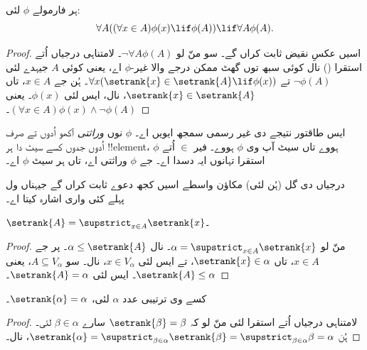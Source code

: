 \documentclass[../../../include/open-logic-section]{subfiles}
\begin{document}
\begin{thm}
ہر فارمولے $\phi$ لئی:
\[
	\forall A((\forall x \in A)\phi(x) \lif \phi(A)) \lif \forall A \phi(A).
\]
\end{thm}

\begin{proof}
اسیں عکسِ نقیض ثابت کراں گے۔ سو منّ لو $\lnot \forall A \phi(A)$۔
لامتناہی درجیاں اُتے استقرا ()
نال کوئی سبھ توں گھٹ ممکن درجے والا غیر-$\phi$ اے، یعنی کوئی $A$
جیہدے لئی $\lnot \phi(A)$ تے $\forall x(\setrank{x} \in \setrank{A} \lif \phi(x))$۔
ہُن جے $x \in A$، تاں $\setrank{x} \in \setrank{A}$،
 نال، ایس لئی $\phi(x)$۔ یعنی
$(\forall x \in A)\phi(x) \land \lnot \phi(A)$۔
\end{proof}\noindent ایس طاقتور نتیجے دی غیر رسمی سمجھ ایویں اے۔
$\phi$ نوں \emph{وراثتی} آکھو اُدوں تے صرف اُدوں جدوں کسے سیٹ دا ہر
!!{element}، $\phi$ ہووے تاں سیٹ آپ وی $\phi$ ہووے۔
فیر $\in$ اُتے استقرا تہانوں ایہ دسدا اے۔ جے $\phi$ وراثتی اے،
تاں ہر سیٹ $\phi$ اے۔

درجیاں دی گل (ہُن لئی) مکاؤن واسطے اسیں کجھ دعوے ثابت کراں گے
جیہناں ول پہلے کئی واری اشارہ کیتا اے۔

\begin{prop}
$\setrank{A} = \supstrict_{x \in A}\setrank{x}$۔
\end{prop}

\begin{proof}
منّ لو $\alpha = \supstrict_{x \in A}\setrank{x}$۔
 نال $\alpha \leq \setrank{A}$۔ پر جے $x \in A$،
تاں $\setrank{x} \in \alpha$، تے ایس لئی $x \in V_\alpha$،
 نال۔ سو $A \subseteq V_\alpha$، یعنی
$\setrank{A} \leq \alpha$۔ ایس لئی $\setrank{A} = \alpha$۔
\end{proof}

\begin{cor}
کسے وی ترتیبی عدد $\alpha$ لئی، $\setrank{\alpha} = \alpha$۔
\end{cor}

\begin{proof}
لامتناہی درجیاں اُتے استقرا لئی منّ لو کہ $\setrank{\beta} = \beta$ سارے
$\beta \in \alpha$ لئی۔ ہُن $\setrank{\alpha} = \supstrict_{\beta \in
\alpha}\setrank{\beta} = \supstrict_{\beta \in \alpha}\beta = \alpha$،
 نال۔
%
\end{proof}
\end{document}
